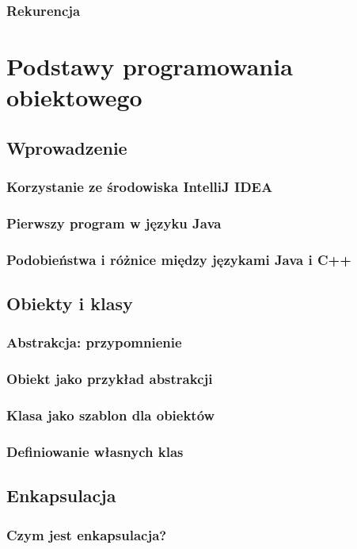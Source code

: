 \documentclass[11pt]{book}
\begin{document}
\section{Rekurencja}


\part{Podstawy programowania obiektowego}
\chapter{Wprowadzenie}
\section{Korzystanie ze środowiska IntelliJ IDEA}
\section{Pierwszy program w języku Java}
\section{Podobieństwa i różnice między językami Java i C++}

\chapter{Obiekty i klasy}
\section{Abstrakcja: przypomnienie}
\section{Obiekt jako przykład abstrakcji}
\section{Klasa jako szablon dla obiektów}
\section{Definiowanie własnych klas}

\chapter{Enkapsulacja}
\section{Czym jest enkapsulacja?}
\end{document}
